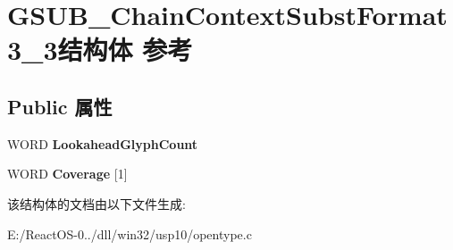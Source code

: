 \hypertarget{struct_g_s_u_b___chain_context_subst_format3__3}{}\section{G\+S\+U\+B\+\_\+\+Chain\+Context\+Subst\+Format3\+\_\+3结构体 参考}
\label{struct_g_s_u_b___chain_context_subst_format3__3}
\subsection*{Public 属性}
\begin{DoxyCompactItemize}
\item 
\mbox{\label{struct_g_s_u_b___chain_context_subst_format3__3_a2840d25915f3921c414381dee347425f}} 
W\+O\+RD {\bfseries Lookahead\+Glyph\+Count}
\item 
\mbox{\label{struct_g_s_u_b___chain_context_subst_format3__3_adcfedd37abe8cb79e843039800966095}} 
W\+O\+RD {\bfseries Coverage} \mbox{[}1\mbox{]}
\end{DoxyCompactItemize}


该结构体的文档由以下文件生成\+:\begin{DoxyCompactItemize}
\item 
E\+:/\+React\+O\+S-\/0../dll/win32/usp10/opentype.\+c\end{DoxyCompactItemize}

